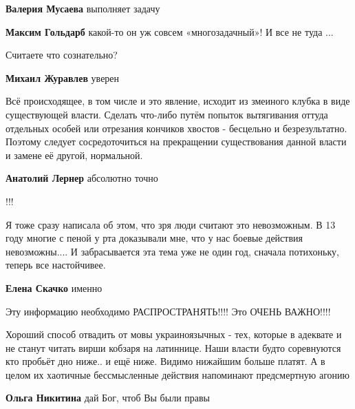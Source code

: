 \begin{itemize}
\begin{itemize} %
\textbf{Валерия Мусаева} выполняет задачу

\textbf{Максим Гольдарб} какой-то он уж совсем «многозадачный»! И все не туда ...
\end{itemize} %

Считаете что сознательно?

\begin{itemize} %
\textbf{Михаил Журавлев} уверен
\end{itemize} %


Всё происходящее, в том числе и это явление, исходит из змеиного клубка в виде
существующей власти. Сделать что-либо путём попыток вытягивания оттуда
отдельных особей или отрезания кончиков хвостов - бесцельно и безрезультатно.
Поэтому следует сосредоточиться на прекращении существования данной власти и
замене её другой, нормальной.

\begin{itemize} %
\textbf{Анатолий Лернер} абсолютно точно
\end{itemize} %

!!!


Я тоже сразу написала об этом, что зря люди считают это невозможным. В 13 году
многие с пеной у рта доказывали мне, что у нас боевые действия невозможны.... И
забрасывается эта тема уже не один год, сначала потихоньку, теперь все
настойчивее.

\begin{itemize} %
\textbf{Елена Скачко} именно
\end{itemize} %

Эту информацию необходимо РАСПРОСТРАНЯТЬ!!!! Это ОЧЕНЬ ВАЖНО!!!!


Хороший способ отвадить от мовы украиноязычных - тех, которые в адеквате и не
станут читать вирши кобзаря на латиннице. Наши власти будто соревнуются кто
пробьёт дно ниже.. и ещё ниже. Видимо нижайшим больше платят. А в целом их
хаотичные бессмысленные действия напоминают предсмертную агонию

\begin{itemize} %
\textbf{Ольга Никитина} дай Бог, чтоб Вы были правы


\end{itemize}
\end{itemize}
